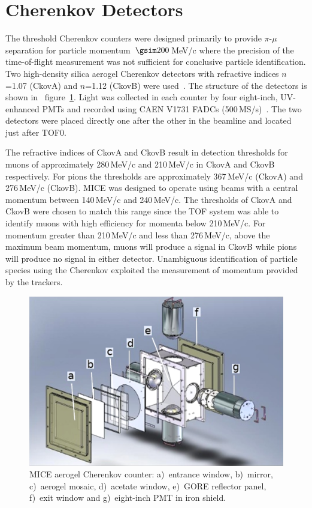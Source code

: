\graphicspath{{03-Ckov/Figures/}}

\section{Cherenkov Detectors}
\label{Sect:Ckov}

The threshold Cherenkov counters were designed primarily to provide
$\pi$-$\mu$ separation for particle momentum~$\gsim 200$\,MeV/c where
the precision of the time-of-flight measurement was not sufficient for
conclusive particle identification.
Two high-density silica aerogel Cherenkov detectors with refractive
indices $n$=1.07 (CkovA) and $n$=1.12 (CkovB) were
used~\cite{Cremaldi:2009zj}.
The structure of the detectors is shown in ~figure~\ref{fig:ckov1}.
Light was collected in each counter by four eight-inch, UV-enhanced
PMTs and recorded using CAEN V1731 FADCs (500\,MS/s)~\cite{NOTE473}.
The two detectors were placed directly one after the other in the
beamline and located just after TOF0.

The refractive indices of CkovA and CkovB result in detection
thresholds for muons of approximately 280\,MeV/c and 210\,MeV/c in
CkovA and CkovB respectively.
For pions the thresholds are approximately 367\,MeV/c (CkovA) and
276\,MeV/c (CkovB).
MICE was designed to operate using beams with a central momentum
between 140\,MeV/c and 240\,MeV/c.
The thresholds of CkovA and CkovB were chosen to match this range
since the TOF system was able to identify muons with high efficiency
for momenta below 210\,MeV/c.
For momentum greater than 210\,MeV/c and less than 276\,MeV/c, above
the maximum beam momentum, muons will produce a signal in CkovB while
pions will produce no signal in either detector.
Unambiguous identification of particle species using the Cherenkov
exploited the measurement of momentum provided by the trackers. \\
\begin{figure}
  \begin{center}
    \includegraphics[width=0.6\columnwidth]{./03-Ckov/Figures/Ckov_fix.png}
  \end{center}
  \caption{
    MICE aerogel Cherenkov counter: a)~entrance window,
    b)~mirror, c)~aerogel mosaic, d)~acetate window, e)~GORE reflector
    panel, f)~exit window and g)~eight-inch PMT in iron shield.
  } 
  \label{fig:ckov1}
\end{figure}

